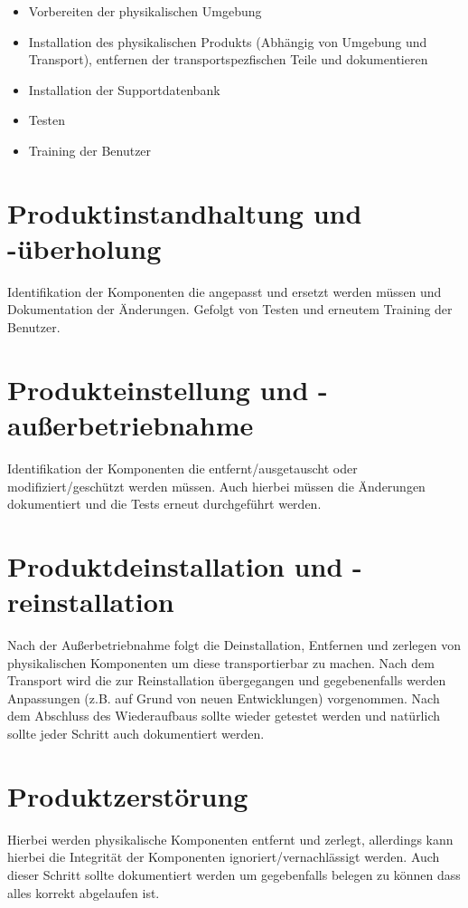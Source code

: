 \begin{itemize}
\item Vorbereiten der physikalischen Umgebung
\item Installation des physikalischen Produkts (Abhängig von  Umgebung und Transport), entfernen der transportspezfischen Teile und dokumentieren
\item Installation der Supportdatenbank
\item Testen
\item Training der Benutzer
\end{itemize}

\section{Produktinstandhaltung und -überholung}
Identifikation der Komponenten die angepasst und ersetzt werden müssen und Dokumentation der Änderungen. Gefolgt von Testen und erneutem Training der Benutzer.

\section{Produkteinstellung und - außerbetriebnahme}
Identifikation der Komponenten die entfernt/ausgetauscht oder modifiziert/geschützt werden müssen. Auch hierbei müssen die Änderungen dokumentiert und die Tests erneut durchgeführt werden.

\section{Produktdeinstallation und -reinstallation}
Nach der Außerbetriebnahme folgt die Deinstallation, Entfernen und zerlegen von physikalischen Komponenten um diese transportierbar zu machen. Nach dem Transport wird die zur Reinstallation übergegangen und gegebenenfalls werden Anpassungen (z.B. auf Grund von neuen Entwicklungen) vorgenommen. Nach dem Abschluss des Wiederaufbaus sollte wieder getestet werden und natürlich sollte jeder Schritt auch dokumentiert werden.

\section{Produktzerstörung}
Hierbei werden physikalische Komponenten entfernt und zerlegt, allerdings kann hierbei die Integrität der Komponenten ignoriert/vernachlässigt werden. Auch dieser Schritt sollte dokumentiert werden um gegebenfalls belegen zu können dass alles korrekt abgelaufen ist.

